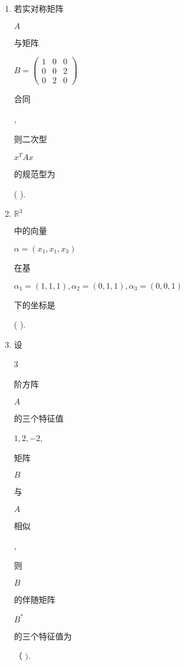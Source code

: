 \documentclass[10pt]{article}
\begin{document}
\begin{enumerate}
  \item \begin{CJK}{UTF8}{mj}若实对称矩阵\end{CJK} $A$ \begin{CJK}{UTF8}{mj}与矩阵\end{CJK} $B=\left(\begin{array}{lll}1 & 0 & 0 \\ 0 & 0 & 2 \\ 0 & 2 & 0\end{array}\right)$ \begin{CJK}{UTF8}{mj}合同\end{CJK}, \begin{CJK}{UTF8}{mj}则二次型\end{CJK} $x^{T} A x$ \begin{CJK}{UTF8}{mj}的规范型为\end{CJK} ( ).

  \item $\mathbb{R}^{3}$ \begin{CJK}{UTF8}{mj}中的向量\end{CJK} $\alpha=\left(x_{1}, x_{1}, x_{3}\right)$ \begin{CJK}{UTF8}{mj}在基\end{CJK} $\alpha_{1}=(1,1,1), \alpha_{2}=(0,1,1), \alpha_{3}=(0,0,1)$ \begin{CJK}{UTF8}{mj}下的坐标是\end{CJK} ( ).

  \item \begin{CJK}{UTF8}{mj}设\end{CJK} 3 \begin{CJK}{UTF8}{mj}阶方阵\end{CJK} $A$ \begin{CJK}{UTF8}{mj}的三个特征值\end{CJK} $1,2,-2$, \begin{CJK}{UTF8}{mj}矩阵\end{CJK} $B$ \begin{CJK}{UTF8}{mj}与\end{CJK} $A$ \begin{CJK}{UTF8}{mj}相似\end{CJK},\begin{CJK}{UTF8}{mj}则\end{CJK} $B$ \begin{CJK}{UTF8}{mj}的伴随矩阵\end{CJK} $B^{*}$ \begin{CJK}{UTF8}{mj}的三个特征值为\end{CJK}（ $)$.


\end{enumerate}
\end{document}
